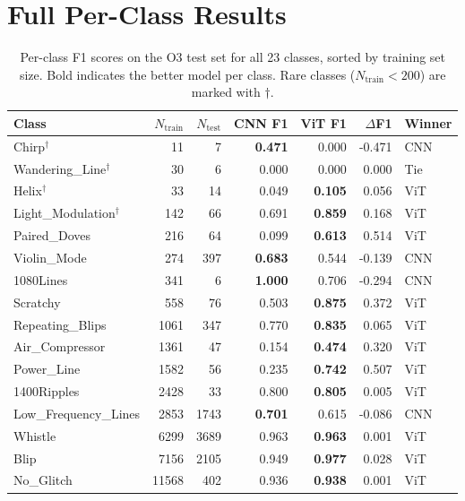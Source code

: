 \documentclass[12pt]{article}
\begin{document}
\clearpage
\appendix
\section{Full Per-Class Results}
\label{app:perclass}

\begin{table}
\centering
\caption{Per-class F1 scores on the O3 test set for all 23 classes, sorted by training set size. Bold indicates the better model per class. Rare classes ($N_\mathrm{train} < 200$) are marked with $\dagger$.}
\label{tab:perclass}
\begin{tabular}{lrrrrrl}
\hline\hline
Class & $N_\mathrm{train}$ & $N_\mathrm{test}$ & CNN F1 & ViT F1 & $\Delta$F1 & Winner \\
\hline
Chirp$^\dagger$ & 11 & 7 & \textbf{0.471} & 0.000 & -0.471 & CNN \\
Wandering\_Line$^\dagger$ & 30 & 6 & 0.000 & 0.000 & 0.000 & Tie \\
Helix$^\dagger$ & 33 & 14 & 0.049 & \textbf{0.105} & 0.056 & ViT \\
Light\_Modulation$^\dagger$ & 142 & 66 & 0.691 & \textbf{0.859} & 0.168 & ViT \\
Paired\_Doves & 216 & 64 & 0.099 & \textbf{0.613} & 0.514 & ViT \\
Violin\_Mode & 274 & 397 & \textbf{0.683} & 0.544 & -0.139 & CNN \\
1080Lines & 341 & 6 & \textbf{1.000} & 0.706 & -0.294 & CNN \\
Scratchy & 558 & 76 & 0.503 & \textbf{0.875} & 0.372 & ViT \\
Repeating\_Blips & 1061 & 347 & 0.770 & \textbf{0.835} & 0.065 & ViT \\
Air\_Compressor & 1361 & 47 & 0.154 & \textbf{0.474} & 0.320 & ViT \\
Power\_Line & 1582 & 56 & 0.235 & \textbf{0.742} & 0.507 & ViT \\
1400Ripples & 2428 & 33 & 0.800 & \textbf{0.805} & 0.005 & ViT \\
Low\_Frequency\_Lines & 2853 & 1743 & \textbf{0.701} & 0.615 & -0.086 & CNN \\
Whistle & 6299 & 3689 & 0.963 & \textbf{0.963} & 0.001 & ViT \\
Blip & 7156 & 2105 & 0.949 & \textbf{0.977} & 0.028 & ViT \\
No\_Glitch & 11568 & 402 & 0.936 & \textbf{0.938} & 0.001 & ViT \\

\end{tabular}
\end{table}
\end{document}
